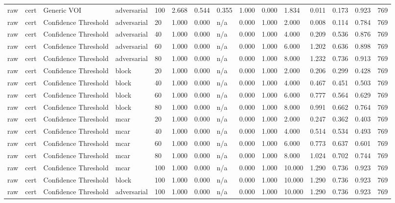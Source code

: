 \begin{table}[!ht]
{\begin{tabular}{lllllllllllllll}
raw & cert & Generic VOI & adversarial & 100 & 2.668 & 0.544 & 0.355 & 1.000 & 0.000 & 1.834 & 0.011 & 0.173 & 0.923 & 769 \\
raw & cert & Confidence Threshold & adversarial & 20 & 1.000 & 0.000 & n/a & 0.000 & 1.000 & 2.000 & 0.008 & 0.114 & 0.784 & 769 \\
raw & cert & Confidence Threshold & adversarial & 40 & 1.000 & 0.000 & n/a & 0.000 & 1.000 & 4.000 & 0.209 & 0.536 & 0.876 & 769 \\
raw & cert & Confidence Threshold & adversarial & 60 & 1.000 & 0.000 & n/a & 0.000 & 1.000 & 6.000 & 1.202 & 0.636 & 0.898 & 769 \\
raw & cert & Confidence Threshold & adversarial & 80 & 1.000 & 0.000 & n/a & 0.000 & 1.000 & 8.000 & 1.232 & 0.736 & 0.913 & 769 \\
raw & cert & Confidence Threshold & block & 20 & 1.000 & 0.000 & n/a & 0.000 & 1.000 & 2.000 & 0.206 & 0.299 & 0.428 & 769 \\
raw & cert & Confidence Threshold & block & 40 & 1.000 & 0.000 & n/a & 0.000 & 1.000 & 4.000 & 0.467 & 0.451 & 0.503 & 769 \\
raw & cert & Confidence Threshold & block & 60 & 1.000 & 0.000 & n/a & 0.000 & 1.000 & 6.000 & 0.777 & 0.564 & 0.629 & 769 \\
raw & cert & Confidence Threshold & block & 80 & 1.000 & 0.000 & n/a & 0.000 & 1.000 & 8.000 & 0.991 & 0.662 & 0.764 & 769 \\
raw & cert & Confidence Threshold & mcar & 20 & 1.000 & 0.000 & n/a & 0.000 & 1.000 & 2.000 & 0.247 & 0.362 & 0.403 & 769 \\
raw & cert & Confidence Threshold & mcar & 40 & 1.000 & 0.000 & n/a & 0.000 & 1.000 & 4.000 & 0.514 & 0.534 & 0.493 & 769 \\
raw & cert & Confidence Threshold & mcar & 60 & 1.000 & 0.000 & n/a & 0.000 & 1.000 & 6.000 & 0.773 & 0.637 & 0.601 & 769 \\
raw & cert & Confidence Threshold & mcar & 80 & 1.000 & 0.000 & n/a & 0.000 & 1.000 & 8.000 & 1.024 & 0.702 & 0.744 & 769 \\
raw & cert & Confidence Threshold & mcar & 100 & 1.000 & 0.000 & n/a & 0.000 & 1.000 & 10.000 & 1.290 & 0.736 & 0.923 & 769 \\
raw & cert & Confidence Threshold & block & 100 & 1.000 & 0.000 & n/a & 0.000 & 1.000 & 10.000 & 1.290 & 0.736 & 0.923 & 769 \\
raw & cert & Confidence Threshold & adversarial & 100 & 1.000 & 0.000 & n/a & 0.000 & 1.000 & 10.000 & 1.290 & 0.736 & 0.923 & 769 \\

\end{tabular}}
\end{table}
